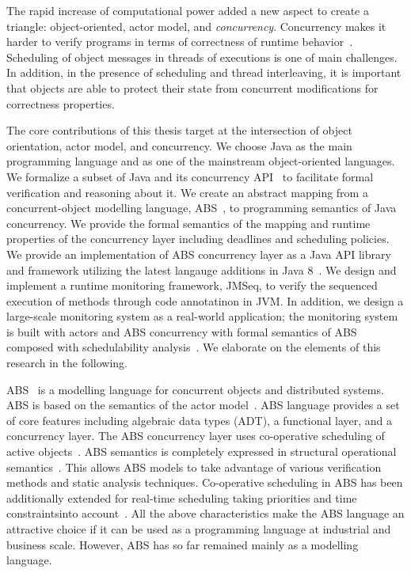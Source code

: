 The rapid increase of computational power added a new aspect to create a triangle: object-oriented, actor model, and \emph{concurrency}.
Concurrency makes it harder to verify programs in terms of correctness of runtime behavior~\cite{Herlihy:1990:linear,johnsen:history,agha:predictive:safety}. 
Scheduling of object messages in threads of executions is one of main challenges.
In addition, in the presence of scheduling and thread interleaving, it is important that objects are able to protect their state from concurrent modifications for correctness properties.

The core contributions of this thesis target at the intersection of object 
orientation, actor model, and concurrency.
We choose Java as the main programming language and as one of the mainstream 
object-oriented languages. 
We formalize a subset of Java and its concurrency API~\cite{jsr166} to 
facilitate formal verification and reasoning about it.
We create an abstract mapping from a concurrent-object modelling language, 
ABS~\cite{johnsen2012abs}, to programming semantics of Java concurrency. 
We provide the formal semantics of the mapping and runtime properties of 
the concurrency layer including deadlines and scheduling policies.
We provide an implementation of ABS concurrency layer as a Java API library 
and framework utilizing the latest langauge additions 
in Java 8~\cite{jsr335:lambda:translation}.
We design and implement a runtime monitoring framework, JMSeq, to verify the
sequenced execution of methods through code annotatinon in JVM. 
In addition, we design a large-scale monitoring system as a real-world 
application; the monitoring system is built with actors and ABS concurrency 
with formal semantics of ABS composed with schedulability 
analysis~\cite{fersman2007task}.
We elaborate on the elements of this research in the following.

ABS~\cite{johnsen2012abs,hahnlehjlssw11} is a modelling language for concurrent objects and distributed systems.
ABS is based on the semantics of the actor model~\cite{actors:agha}.
ABS language provides a set of core features including algebraic data types (ADT), a functional layer, and a concurrency layer.
The ABS concurrency layer uses co-operative scheduling of active objects~\cite{creol:broch:owe}.
ABS semantics is completely expressed in structural operational semantics~\cite{plotkin:sos}.
This allows ABS models to take advantage of various verification methods and static analysis techniques.
% 
Co-operative scheduling in ABS has been additionally extended for real-time scheduling taking priorities and time constraintsinto account~\cite{bjork2013:rtabs,johnsen2012modeling}.
All the above characteristics make the ABS language an attractive choice if it
can be used as a programming language at industrial and business scale.
However, ABS has so far remained mainly as a modelling language.

